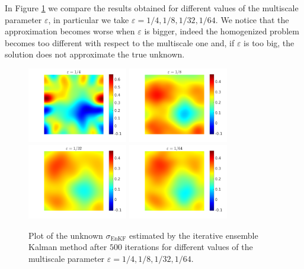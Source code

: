 \documentclass[10pt]{article}
\begin{document}
In Figure \ref{fig:comparison_e} we compare the results obtained for different values of the multiscale parameter $\varepsilon$, in particular we take $\varepsilon = 1/4, 1/8, 1/32, 1/64$. We notice that the approximation becomes worse when $\varepsilon$ is bigger, indeed the homogenized problem becomes too different with respect to the multiscale one and, if $\varepsilon$ is too big, the solution does not approximate the true unknown.

\begin{figure}[t]
\centering
\includegraphics[width = 0.39\textwidth]{ensemble_500_e4}
\includegraphics[width = 0.39\textwidth]{ensemble_500_e8}
\\
\includegraphics[width = 0.39\textwidth]{ensemble_500_e32}
\includegraphics[width = 0.39\textwidth]{ensemble_500_e64}
\caption{Plot of the unknown $\sigma_{\mathrm{EnKF}}$ estimated by the iterative ensemble Kalman method after $500$ iterations for different values of the multiscale parameter $\varepsilon = 1/4, 1/8, 1/32, 1/64$.}
\label{fig:comparison_e}
\end{figure}
\end{document}
